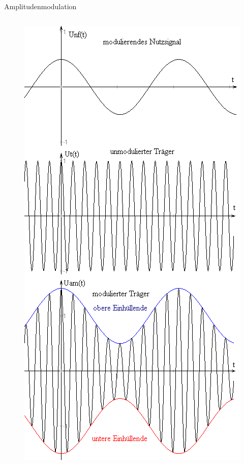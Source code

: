 \begin{frame}{Amplitudenmodulation}
  \begin{columns}[c]
    \begin{figure}
      \includegraphics[width=\textwidth,height=.7\textheight,keepaspectratio]{e14/AM1.png}

\end{figure}
\end{columns}
\end{frame}
